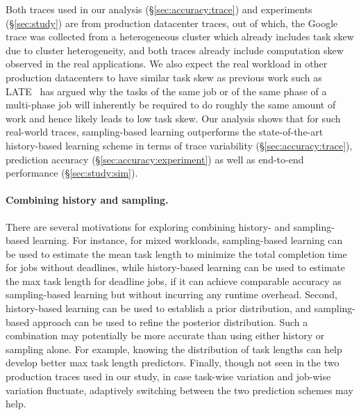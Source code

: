 {
Both traces used in our analysis (\S\ref{sec:accuracy:trace}) and experiments
(\S\ref{sec:study}) are from production datacenter traces, out of
which, the Google trace \cite{googleTraceGithub} was collected from a
heterogeneous cluster which already includes task skew due to cluster
heterogeneity,
and both traces {already} include computation skew observed in the
real applications.
%
We also expect the real workload in other production datacenters to have similar
task skew as previous work such as LATE~\cite{late:osdi08} has argued 
why the tasks of the same job or of the same phase of a multi-phase
job will inherently be required to do roughly the same amount of work
and hence likely leads to low task skew.
\fi
Our analysis shows that for such real-world
traces, sampling-based learning outperforms the state-of-the-art
history-based learning scheme in terms of trace variability (\S\ref{sec:accuracy:trace}),
prediction accuracy (\S\ref{sec:accuracy:experiment}) as well as
end-to-end performance (\S\ref{sec:study:sim}).


\fi

\paragraph{Combining history and sampling.}
There are several motivations for exploring combining history-
and sampling-based learning. 
%
For instance, for mixed workloads, sampling-based learning can be used
to estimate the mean task length to minimize the total completion
time for jobs without deadlines, while history-based learning can be
used to estimate the max task length for deadline jobs, if it
can achieve comparable accuracy as 
sampling-based learning but without incurring any runtime overhead.
Second, history-based learning can be used to establish a prior
distribution, and sampling-based approach can be used to refine the
posterior distribution. Such a combination may potentially be more accurate
than using either history or sampling alone. For example,
knowing the distribution of task lengths can help develop better
max task length predictors.
Finally, though not seen in the two production traces used in our study,
in case task-wise variation and job-wise variation fluctuate, adaptively switching
between the two prediction schemes may help.


}
